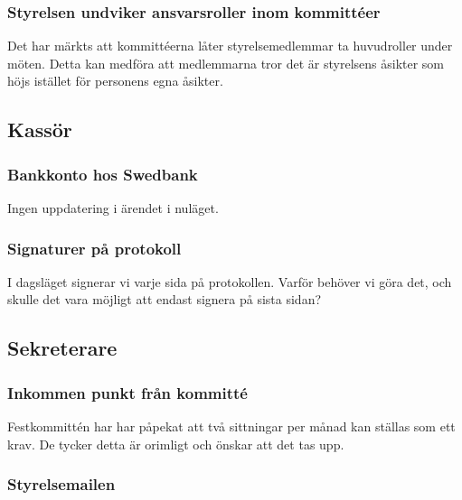 \documentclass[protokoll]{dvd}
\begin{document}
\subsubsection{Styrelsen undviker ansvarsroller inom kommittéer}

Det har märkts att kommittéerna låter styrelsemedlemmar ta huvudroller under möten. Detta kan medföra att medlemmarna tror det är styrelsens åsikter som höjs istället för personens egna åsikter. 




\newpage

\subsection{Kassör}

\subsubsection{Bankkonto hos Swedbank}

\begin{description}[style=multiline, widest=00.00, align=left, leftmargin=2.5cm]
    \item[2021-10-11] Ingen uppdatering i ärendet i nuläget.
\end{description}


\subsubsection{Signaturer på protokoll}

I dagsläget signerar vi varje sida på protokollen. Varför behöver vi göra det, och skulle det vara möjligt att endast signera på sista sidan?




\newpage

\subsection{Sekreterare}

\subsubsection{Inkommen punkt från kommitté}

Festkommittén har har påpekat att två sittningar per månad kan ställas som ett krav. De tycker detta är orimligt och önskar att det tas upp.


\subsubsection{Styrelsemailen}
\end{document}
